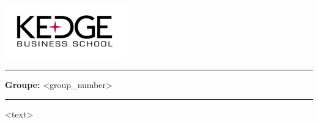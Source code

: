 \documentclass[11pt]{report} %
\begin{document}
    \begin{center}
        \includegraphics[width=150pt]{logo.png}
    \end{center}

  \begin{center}
      \rule{0.1\linewidth}{1pt}
   \end{center}

\textbf{Groupe:} <group_number>
  
  \begin{center}
      \rule{0.1\linewidth}{1pt}
   \end{center}

<text>  
\end{document}
